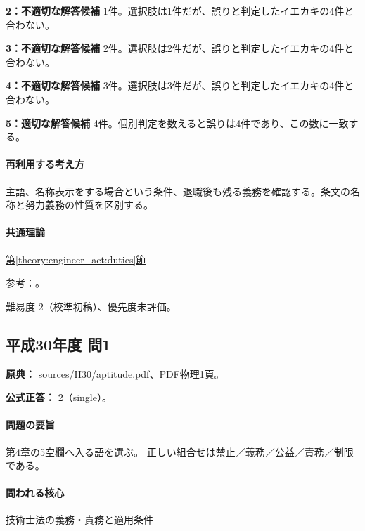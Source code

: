 \noindent\textbf{2：不適切な解答候補} 1件。選択肢は1件だが、誤りと判定したイエカキの4件と合わない。\par

\noindent\textbf{3：不適切な解答候補} 2件。選択肢は2件だが、誤りと判定したイエカキの4件と合わない。\par

\noindent\textbf{4：不適切な解答候補} 3件。選択肢は3件だが、誤りと判定したイエカキの4件と合わない。\par

\noindent\textbf{5：適切な解答候補} 4件。個別判定を数えると誤りは4件であり、この数に一致する。\par

\paragraph{再利用する考え方} 主語、名称表示をする場合という条件、退職後も残る義務を確認する。条文の名称と努力義務の性質を区別する。

\paragraph{共通理論} \hyperref[theory:engineer_act:duties]{第\ref*{theory:engineer_act:duties}節}

\par 参考：\cite{engineer_act_current}。

\par 難易度 2（校準初稿）、優先度未評価。

\subsection{平成30年度 問1}
\label{q:h30-reg-apt-01}

\noindent\textbf{原典：} sources/H30/aptitude.pdf、PDF物理1頁。

\textbf{公式正答：} 2（single）。

\paragraph{問題の要旨} 第4章の5空欄へ入る語を選ぶ。 正しい組合せは禁止／義務／公益／責務／制限である。

\paragraph{問われる核心} 技術士法の義務・責務と適用条件

